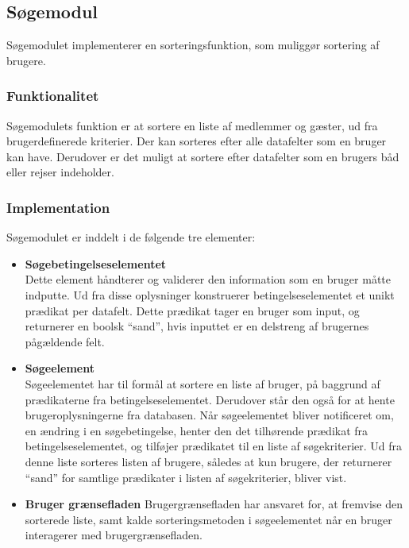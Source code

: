 \subsection{Søgemodul}
\label{sub:s_searchmodul}

Søgemodulet implementerer en sorteringsfunktion, som muliggør sortering af brugere.

\subsubsection{Funktionalitet}
\label{sub:funktionalitet}

Søgemodulets funktion er at sortere en liste af medlemmer og gæster, ud fra brugerdefinerede kriterier. Der kan sorteres efter alle datafelter som en bruger kan have. Derudover er det muligt at sortere efter datafelter som en brugers båd eller rejser indeholder.

\subsubsection{Implementation}
\label{sub:implementation}

Søgemodulet er inddelt i de følgende tre elementer:

\begin{itemize}
	\item \textbf{Søgebetingelseselementet} \\
		Dette element håndterer og validerer den information som en bruger måtte indputte. Ud fra disse oplysninger konstruerer betingelseselementet et unikt prædikat per datafelt. Dette prædikat tager en bruger som input, og returnerer en boolsk \enquote{sand}, hvis inputtet er en delstreng af brugernes pågældende felt.

	\item \textbf{Søgeelement} \\
    Søgeelementet har til formål at sortere en liste af bruger, på baggrund af prædikaterne fra betingelseselementet. Derudover står den også for at hente brugeroplysningerne fra databasen. Når søgeelementet bliver notificeret om, en ændring i en søgebetingelse, henter den det tilhørende prædikat fra betingelseselementet, og tilføjer prædikatet til en liste af søgekriterier. Ud fra denne liste sorteres listen af brugere, således at kun brugere, der returnerer \enquote{sand} for samtlige prædikater i listen af søgekriterier, bliver vist.

	\item \textbf{Bruger grænsefladen}
		Brugergrænsefladen har ansvaret for, at fremvise den sorterede liste, samt kalde sorteringsmetoden i søgeelementet når en bruger interagerer med brugergrænsefladen.
\end{itemize}



